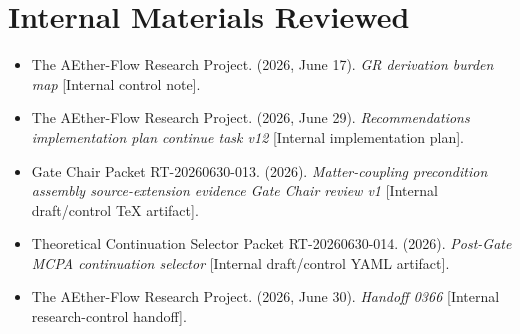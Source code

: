 \documentclass[11pt]{article}
\begin{document}
\section{Internal Materials Reviewed}

\begin{itemize}[leftmargin=2em]
\item The AEther-Flow Research Project. (2026, June 17). \textit{GR derivation burden map} [Internal control note].
\item The AEther-Flow Research Project. (2026, June 29). \textit{Recommendations implementation plan continue task v12} [Internal implementation plan].
\item Gate Chair Packet RT-20260630-013. (2026). \textit{Matter-coupling precondition assembly source-extension evidence Gate Chair review v1} [Internal draft/control TeX artifact].
\item Theoretical Continuation Selector Packet RT-20260630-014. (2026). \textit{Post-Gate MCPA continuation selector} [Internal draft/control YAML artifact].
\item The AEther-Flow Research Project. (2026, June 30). \textit{Handoff 0366} [Internal research-control handoff].
\end{itemize}
\end{document}
